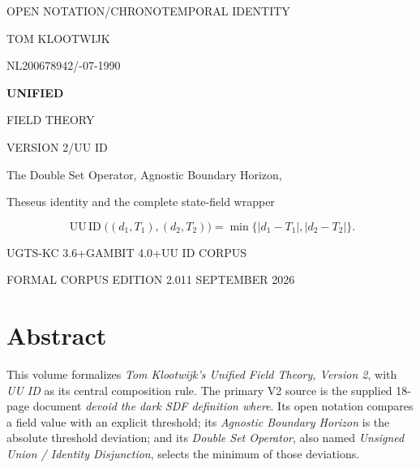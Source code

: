 \documentclass[11pt,a4paper]{article}
\numberwithin{equation}{section}
\newcommand{\uu}{\operatorname{UU\,ID}}
\begin{document}
\hypersetup{pageanchor=false}
\begin{titlepage}\thispagestyle{empty}
\color{white}\vspace*{12mm}
{\sffamily\small OPEN NOTATION\quad /\quad CHRONOTEMPORAL IDENTITY\par}
\vspace{24mm}
{\sffamily\fontsize{29}{34}\selectfont TOM KLOOTWIJK\par}
\vspace{5mm}
{\sffamily\fontsize{12}{17}\selectfont NL200678942\quad /-07-1990\par}
\vspace{16mm}
{\sffamily\bfseries\fontsize{44}{49}\selectfont UNIFIED\par FIELD THEORY\par}
\vspace{9mm}
{\sffamily\fontsize{26}{31}\selectfont VERSION 2\quad /\quad UU ID\par}
\vspace{10mm}
{\sffamily\fontsize{14}{20}\selectfont The Double Set Operator, Agnostic Boundary Horizon,\par Theseus identity and the complete state-field wrapper\par}
\vspace{8mm}
{\fontsize{19}{25}\selectfont
\[\uu\big((d_1,T_1),(d_2,T_2)\big)
 =\min\{|d_1-T_1|,|d_2-T_2|\}.\]}
\vfill
{\sffamily\small UGTS-KC 3.6\enspace +\enspace GAMBIT 4.0\enspace +\enspace UU ID CORPUS\par}
\vspace{6mm}
{\sffamily\small FORMAL CORPUS EDITION 2.0\hfill 11 SEPTEMBER 2026\par}
\vspace{11mm}
\end{titlepage}
\hypersetup{pageanchor=true}
\section*{Abstract}
This volume formalizes \emph{Tom Klootwijk's Unified Field Theory, Version 2}, with \emph{UU ID} as its central composition rule. The primary V2 source is the supplied 18-page document \emph{devoid the dark SDF definition where}. Its open notation compares a field value with an explicit threshold; its \emph{Agnostic Boundary Horizon} is the absolute threshold deviation; and its \emph{Double Set Operator}, also named \emph{Unsigned Union / Identity Disjunction}, selects the minimum of those deviations.
\end{document}
